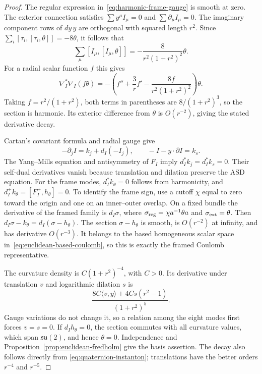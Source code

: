 \documentclass[11pt]{amsart}
\theoremstyle{definition}
\theoremstyle{remark}
\theoremstyle{plain}
\begin{document}
\begin{proof}
The regular expression in~\eqref{eq:harmonic-frame-gauge} is smooth
at zero.  The exterior connection satisfies
$\sum y^\mu I_\mu=0$ and $\sum\partial_\mu I_\mu=0$.
The imaginary component rows of $dy\,\bar y$ are orthogonal with
squared length $r^2$.  Since
$\sum_i[\tau_i,[\tau_i,\theta]]=-8\theta$, it follows that
\[
 \sum_\mu[I_\mu,[I_\mu,\theta]]
 =-\frac{8}{r^2(1+r^2)^2}\theta.
\]
For a radial scalar function $f$ this gives
\begin{equation}\label{eq:radial-adjoint-laplacian}
 \nabla_I^*\nabla_I(f\theta)
 =-\left(f''+\frac3r f'-\frac{8f}{r^2(1+r^2)^2}\right)\theta.
\end{equation}
Taking $f=r^2/(1+r^2)$, both terms in parentheses are
$8/(1+r^2)^3$, so the section is harmonic.  Its exterior difference
from $\theta$ is $O(r^{-2})$, giving the stated derivative decay.

Cartan's covariant formula and radial gauge give
\begin{equation}\label{eq:parameter-gauge-decomposition}
 -\partial_jI=k_j+d_I(-I_j),\qquad
 -I-y\cdot\partial I=k_s.
\end{equation}
The Yang--Mills equation and antisymmetry of $F_I$ imply
$d_I^*k_j=d_I^*k_s=0$.  Their self-dual derivatives vanish because
translation and dilation preserve the ASD equation.  For the frame modes,
$d_I^*k_\theta=0$ follows from harmonicity, and
$d_I^+k_\theta=[F_I^+,h_\theta]=0$.
To identify the frame sign, use a cutoff $\chi$ equal to zero toward
the origin and one on an inner--outer overlap.  On a fixed bundle the
derivative of the framed family is $d_I\sigma$, where
$\sigma_{\rm reg}=\chi a^{-1}\theta a$ and
$\sigma_{\rm ext}=\theta$.  Then
$d_I\sigma-k_\theta=d_I(\sigma-h_\theta)$.
The section $\sigma-h_\theta$ is smooth, is $O(r^{-2})$ at infinity,
and has derivative $O(r^{-3})$.  It belongs to the based homogeneous
scalar space in~\eqref{eq:euclidean-based-coulomb}, so this is exactly
the framed Coulomb representative.

The curvature density is $C(1+r^2)^{-4}$, with $C>0$.
Its derivative under translation $v$ and logarithmic dilation $s$ is
\[
 \frac{8C\langle v,y\rangle+4Cs(r^2-1)}{(1+r^2)^5}.
\]
Gauge variations do not change it, so a relation among the eight modes
first forces $v=s=0$.  If $d_Ih_\theta=0$, the section commutes with
all curvature values, which span $\mathfrak{su}(2)$, and hence
$\theta=0$.  Independence and Proposition~\ref{prop:euclidean-fredholm}
give the basis assertion.  The decay also follows directly from
\eqref{eq:quaternion-instanton}; translations have the better orders
$r^{-4}$ and $r^{-5}$.
\end{proof}
\end{document}
